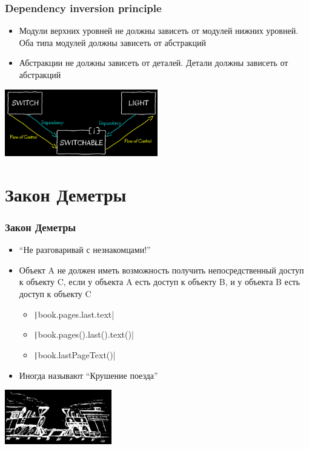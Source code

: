 \documentclass{../cscslides}
\begin{document}
    \begin{frame}
        \frametitle{Dependency inversion principle}
        \begin{itemize}
            \item Модули верхних уровней не должны зависеть от модулей нижних уровней. Оба типа модулей должны зависеть от абстракций
            \item Абстракции не должны зависеть от деталей. Детали должны зависеть от абстракций
        \end{itemize}
        \begin{flushright}
            \includegraphics[width=0.5\textwidth]{dependencyInversionPrincipleBlack.png}
        \end{flushright}
    \end{frame}

    \section{Закон Деметры}

    \begin{frame}
        \frametitle{Закон Деметры}
        \begin{itemize}
            \item ``Не разговаривай с незнакомцами!''
            \item Объект A не должен иметь возможность получить непосредственный доступ к объекту C, если у объекта A есть доступ к объекту B, и у объекта B есть доступ к объекту C
            \begin{itemize}
                \item \texttt|book.pages.last.text|
                \item \texttt|book.pages().last().text()|
                \item \texttt|book.lastPageText()|
            \end{itemize}
            \item Иногда называют ``Крушение поезда''
        \end{itemize}
        \begin{flushright}
            \includegraphics[width=0.35\textwidth]{trainsBlack.png}
        \end{flushright}
        \vspace{-0.8cm}
    \end{frame}
\end{document}
